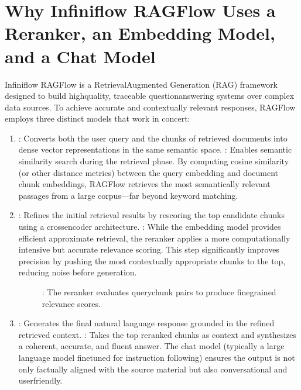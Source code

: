 \documentclass[letterpaper,10pt,english]{sphinxmanual}
\begin{document}
\section{Why Infiniflow RAGFlow Uses a Reranker, an Embedding Model, and a Chat Model}
\label{\detokenize{rerank:why-infiniflow-ragflow-uses-a-reranker-an-embedding-model-and-a-chat-model}}
\sphinxAtStartPar
Infiniflow RAGFlow is a Retrieval\sphinxhyphen{}Augmented Generation (RAG) framework designed to build high\sphinxhyphen{}quality, traceable question\sphinxhyphen{}answering systems over complex data sources. To achieve accurate and contextually relevant responses, RAGFlow employs three distinct models that work in concert:
\begin{enumerate}
%
\item {} 
\sphinxAtStartPar
{}
\sphinxhyphen{} : Converts both the user query and the chunks of retrieved documents into dense vector representations in the same semantic space.
\sphinxhyphen{} : Enables semantic similarity search during the retrieval phase. By computing cosine similarity (or other distance metrics) between the query embedding and document chunk embeddings, RAGFlow retrieves the most semantically relevant passages from a large corpus—far beyond keyword matching.

\item {} 
\sphinxAtStartPar
{}
\sphinxhyphen{} : Refines the initial retrieval results by re\sphinxhyphen{}scoring the top\sphinxhyphen{} candidate chunks using a cross\sphinxhyphen{}encoder architecture.
\sphinxhyphen{} : While the embedding model provides efficient approximate retrieval, the reranker applies a more computationally intensive but accurate relevance scoring. This step significantly improves precision by pushing the most contextually appropriate chunks to the top, reducing noise before generation.

\begin{figure}[htbp]
\centering
\capstart

\noindent{}
\caption{: The reranker evaluates query\sphinxhyphen{}chunk pairs to produce fine\sphinxhyphen{}grained relevance scores.}\label{\detokenize{rerank:id1}}\end{figure}

\item {} 
\sphinxAtStartPar
{}
\sphinxhyphen{} : Generates the final natural language response grounded in the refined retrieved context.
\sphinxhyphen{} : Takes the top reranked chunks as context and synthesizes a coherent, accurate, and fluent answer. The chat model (typically a large language model fine\sphinxhyphen{}tuned for instruction following) ensures the output is not only factually aligned with the source material but also conversational and user\sphinxhyphen{}friendly.

\end{enumerate}
\end{document}
